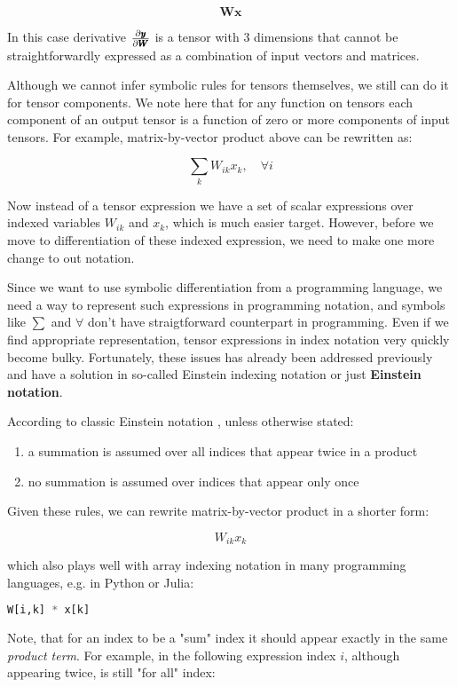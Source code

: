 \documentclass[conference]{IEEEtran}
\begin{document}
$$\pmb{W}\pmb{x}$$

In this case derivative $\pdv{\pmb{y}}{\pmb{W}}$ is a tensor with 3
dimensions that cannot be straightforwardly expressed as a combination
of input vectors and matrices.

Although we cannot infer symbolic rules for tensors themselves, we
still can do it for tensor components. We note here that for any
function on tensors each component of an output tensor is a function
of zero or more components of input tensors. For example,
matrix-by-vector product above can be rewritten as:

$$\sum_kW_{ik}x_k ,\quad \forall i$$

Now instead of a tensor expression we have a set of scalar expressions
over indexed variables $W_{ik}$ and $x_k$, which is much easier
target.  However, before we move to differentiation of these indexed
expression, we need to make one more change to out notation.

Since we want to use symbolic differentiation from a programming
language, we need a way to represent such expressions in programming
notation, and symbols like $\sum$ and $\forall$ don't have
straigtforward counterpart in programming. Even if we find appropriate
representation, tensor expressions in index notation very quickly
become bulky. Fortunately, these issues has already been addressed
previously and have a solution in so-called Einstein indexing notation
or just \textbf{Einstein notation}.

According to classic Einstein notation \cite{Dullemond1991}, unless
otherwise stated:


\begin{enumerate}
\item a summation is assumed over all indices that appear twice in a
  product
\item no summation is assumed over indices that appear only once
\end{enumerate}

Given these rules, we can rewrite matrix-by-vector product in a
shorter form:


$$W_{ik}x_k$$

which also plays well with array indexing notation in many programming
languages, e.g. in Python or Julia:

\begin{lstlisting}[language=Python]
  W[i,k] * x[k]
\end{lstlisting}

Note, that for an index to be a "sum" index it should appear exactly
in the same \textit{product term}. For example, in the following
expression index $i$, although appearing twice, is still "for all"
index:
\end{document}

